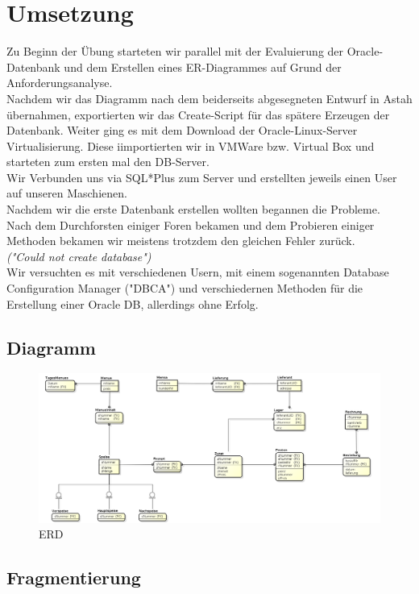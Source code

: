 \documentclass[12pt,a4paper]{article}
\begin{document}
	\section{Umsetzung}
		Zu Beginn der Übung starteten wir parallel mit der Evaluierung der Oracle-Datenbank und dem Erstellen eines ER-Diagrammes auf Grund der Anforderungsanalyse.\\
		Nachdem wir das Diagramm nach dem beiderseits abgesegneten Entwurf in Astah übernahmen, exportierten wir das Create-Script für das spätere Erzeugen der Datenbank.
		Weiter ging es mit dem Download der Oracle-Linux-Server Virtualisierung. Diese iimportierten wir in VMWare bzw. Virtual Box und starteten zum ersten mal den DB-Server.\\
		Wir Verbunden uns via SQL*Plus zum Server und erstellten jeweils einen User auf unseren Maschienen.\\
		Nachdem wir die erste Datenbank erstellen wollten begannen die Probleme.\\
		Nach dem Durchforsten einiger Foren bekamen und dem Probieren einiger Methoden bekamen wir meistens trotzdem den gleichen Fehler zurück.\\
		\textit{("Could not create database")}\\
		Wir versuchten es mit verschiedenen Usern, mit einem sogenannten Database Configuration Manager ("DBCA") und verschiedernen Methoden für die Erstellung einer Oracle DB, allerdings ohne Erfolg.\newpage
		
		\subsection{Diagramm}
			\begin{figure}[h!]
				\centering
				\includegraphics[width=1\linewidth]{ERD/MensaEr.png}
				\caption{ERD}
				\label{fig:MensaEr.png}
			\end{figure}
		\subsection{Fragmentierung}
\end{document}
